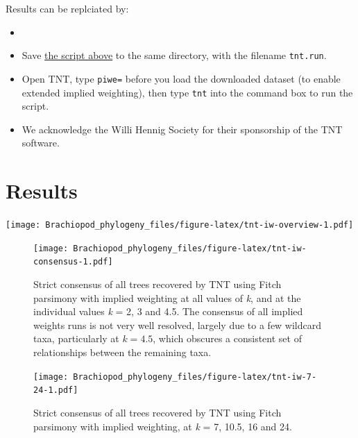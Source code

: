 \documentclass[openany]{book}
\providecommand{\tightlist}{%
  \setlength{\itemsep}{0pt}\setlength{\parskip}{0pt}}
\begin{document}
Results can be replciated by:

\begin{itemize}
\item
\item
  Save
  \href{https://raw.githubusercontent.com/ms609/hyoliths/master/tnt.run}{the
  script above} to the same directory, with the filename
  \texttt{tnt.run}.
\item
  Open TNT, type \texttt{piwe=} before you load the downloaded dataset
  (to enable extended implied weighting), then type \texttt{tnt} into
  the command box to run the script.
\item
  We acknowledge the Willi Hennig Society for their sponsorship of the
  TNT software.
\end{itemize}

\section{Results}\label{results}

\texttt{[image: Brachiopod\_phylogeny\_files/figure-latex/tnt-iw-overview-1.pdf]}









\begin{figure}
\centering
\texttt{[image: Brachiopod\_phylogeny\_files/figure-latex/tnt-iw-consensus-1.pdf]}
\caption{\label{fig:tnt-iw-consensus}Strict consensus of all trees recovered by TNT
using Fitch parsimony with implied weighting at all values of \emph{k}, and at the individual
values \emph{k} = 2, 3 and 4.5.
The consensus of all implied weights runs is
not very well resolved, largely due to a few wildcard taxa, particularly
at \(k = 4.5\), which obscures a consistent set of relationships between
the remaining taxa.}
\end{figure}

\begin{figure}
\centering
\texttt{[image: Brachiopod\_phylogeny\_files/figure-latex/tnt-iw-7-24-1.pdf]}
\caption{\label{fig:tnt-iw-7-24}Strict consensus of all trees recovered by TNT
using Fitch parsimony with implied weighting, at \emph{k} = 7, 10.5, 16 and 24.}
\end{figure}
\end{document}
